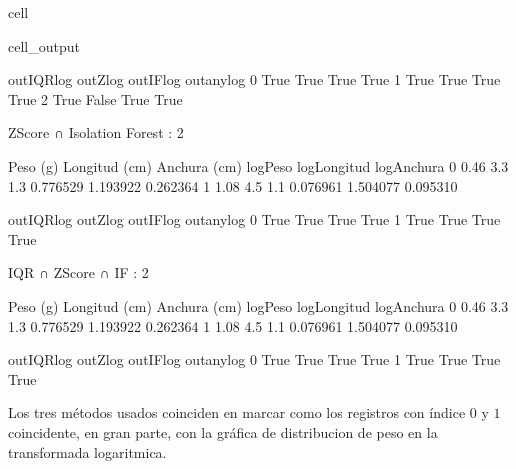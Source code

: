\documentclass[a4paper,10pt,spanish]{jupyterBook}
\begin{document}
\begin{sphinxuseclass}{cell}
\begin{sphinxVerbatimOutput}
\begin{sphinxuseclass}{cell_output}
\begin{sphinxVerbatim}[commandchars=\\\{\}]
   out\PYGZus{}IQR\PYGZus{}log  out\PYGZus{}Z\PYGZus{}log  out\PYGZus{}IF\PYGZus{}log  out\PYGZus{}any\PYGZus{}log
0         True       True        True         True
1         True       True        True         True
2         True      False        True         True
\end{sphinxVerbatim}

\begin{sphinxVerbatim}[commandchars=\\\{\}]
Z\PYGZhy{}Score ∩ Isolation Forest : 2
\end{sphinxVerbatim}

\begin{sphinxVerbatim}[commandchars=\\\{\}]
   Peso (g)  Longitud (cm)  Anchura (cm)  log\PYGZus{}Peso  log\PYGZus{}Longitud  log\PYGZus{}Anchura  \PYGZbs{}
0      0.46            3.3           1.3 \PYGZhy{}0.776529      1.193922     0.262364
1      1.08            4.5           1.1  0.076961      1.504077     0.095310

   out\PYGZus{}IQR\PYGZus{}log  out\PYGZus{}Z\PYGZus{}log  out\PYGZus{}IF\PYGZus{}log  out\PYGZus{}any\PYGZus{}log
0         True       True        True         True
1         True       True        True         True
\end{sphinxVerbatim}

\begin{sphinxVerbatim}[commandchars=\\\{\}]
IQR ∩ Z\PYGZhy{}Score ∩ IF         : 2
\end{sphinxVerbatim}

\begin{sphinxVerbatim}[commandchars=\\\{\}]
   Peso (g)  Longitud (cm)  Anchura (cm)  log\PYGZus{}Peso  log\PYGZus{}Longitud  log\PYGZus{}Anchura  \PYGZbs{}
0      0.46            3.3           1.3 \PYGZhy{}0.776529      1.193922     0.262364
1      1.08            4.5           1.1  0.076961      1.504077     0.095310

   out\PYGZus{}IQR\PYGZus{}log  out\PYGZus{}Z\PYGZus{}log  out\PYGZus{}IF\PYGZus{}log  out\PYGZus{}any\PYGZus{}log
0         True       True        True         True
1         True       True        True         True
\end{sphinxVerbatim}

\end{sphinxuseclass}\end{sphinxVerbatimOutput}

\end{sphinxuseclass}
\sphinxAtStartPar
Los tres métodos usados coinciden en marcar como  los registros con índice \(0\) y \(1\) coincidente, en gran parte, con la gráfica de distribucion de peso en la transformada logaritmica.
\end{document}
